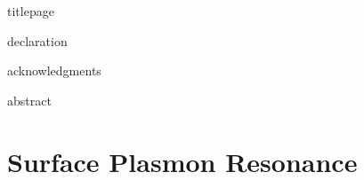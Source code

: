 \documentclass[a4paper,titlepage,onecolumn]{report}
\begin{document}
{titlepage}

{declaration}

{acknowledgments}

\tableofcontents

{abstract}




\part{Surface Plasmon Resonance}
\end{document}
